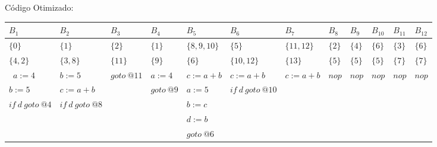 C\'odigo Otimizado:

\begin{table}[ht]
\begin{scriptsize}
\begin{tabular}{l|l|l|l|l|l|l|l|l|l|l|l}
$B_{1}$ & $B_{2}$ & $B_{3}$ & $B_{4}$ & $B_{5}$ & $B_{6}$ & $B_{7}$ & $B_{8}$ & $B_{9}$ & $B_{10}$ & $B_{11}$ & $B_{12}$ \\
\hline
$\{0\}$ & $\{1\}$ & $\{2\}$ & $\{1\}$ & $\{8, 9, 10\}$ & $\{5\}$ & $\{11, 12\}$ & $\{2\}$ & $\{4\}$ & $\{6\}$ & $\{3\}$ & $\{6\}$ \\
$\{4, 2\}$ & $\{3, 8\}$ & $\{11\}$ & $\{9\}$ & $\{6\}$ & $\{10, 12\}$ & $\{13\}$ & $\{5\}$ & $\{5\}$ & $\{5\}$ & $\{7\}$ & $\{7\}$ \\
\hline\
$a:=4$ & $b:=5$ & $goto\:@11$ & $a:=4$ & $c:=a+b$ & $c:=a+b$ & $c:=a+b$ & $nop$ & $nop$ & $nop$ & $nop$ & $nop$ \\
$b:=5$ & $c:=a+b$ &  & $goto\:@9$ & $a:=5$ & $if\:d\:goto\:@10$ &  &  &  &  &  &  \\
$if\:d\:goto\:@4$ & $if\:d\:goto\:@8$ &  &  & $b:=c$ &  &  &  &  &  &  &  \\
 &  &  &  & $d:=b$ &  &  &  &  &  &  &  \\
 &  &  &  & $goto\:@6$ &  &  &  &  &  &  &  \\
\end{tabular}
\end{scriptsize}
\end{table}

